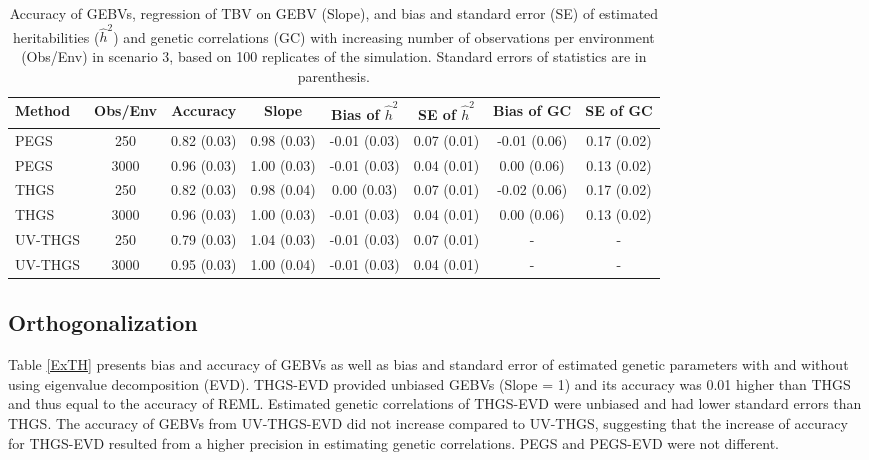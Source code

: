 \documentclass{bmcart}
\begin{document}
\begin{table}[ht]
\centering
\renewcommand*{\arraystretch}{1.2}
\caption{Accuracy of GEBVs, regression of TBV on GEBV (Slope), and bias and standard error (SE) of estimated heritabilities ($\hat{h}^2$) and genetic correlations (GC) with increasing number of observations per environment (Obs/Env) in scenario 3, based on 100 replicates of the simulation. Standard errors of statistics are in parenthesis.}\smallskip
\begin{tabular}{l c c c c c c c}
 \hline
Method & Obs/Env & Accuracy & Slope & Bias of $\hat{h}^2$ & SE of $\hat{h}^2$ & Bias of GC& SE of GC \\
 \hline
PEGS & 250 & 0.82 (0.03) & 0.98 (0.03) & -0.01 (0.03) & 0.07 (0.01) & -0.01 (0.06) & 0.17 (0.02) \\
PEGS & 3000 & 0.96 (0.03) & 1.00 (0.03) & -0.01 (0.03) & 0.04 (0.01) & 0.00 (0.06) & 0.13 (0.02) \\
THGS & 250 & 0.82 (0.03) & 0.98 (0.04) & 0.00 (0.03) & 0.07 (0.01) & -0.02 (0.06) & 0.17 (0.02) \\
THGS & 3000 & 0.96 (0.03) & 1.00 (0.03) & -0.01 (0.03) & 0.04 (0.01) & 0.00 (0.06) & 0.13 (0.02) \\
UV-THGS & 250 & 0.79 (0.03) & 1.04 (0.03) & -0.01 (0.03) & 0.07 (0.01) & - & - \\
UV-THGS & 3000 & 0.95 (0.03) & 1.00 (0.04) & -0.01 (0.03) & 0.04 (0.01) & - & - \\
 \hline
\end{tabular}
\label{VaryN}
\end{table}

\subsection{Orthogonalization}

Table \ref{ExTH} presents bias and accuracy of GEBVs as well as bias and standard error of estimated genetic parameters with and without using eigenvalue decomposition (EVD). THGS-EVD provided unbiased GEBVs (Slope = 1) and its accuracy was 0.01 higher than THGS and thus equal to the accuracy of REML. Estimated genetic correlations of THGS-EVD were unbiased and had lower standard errors than THGS. The accuracy of GEBVs from UV-THGS-EVD did not increase compared to UV-THGS, suggesting that the increase of accuracy for THGS-EVD resulted from a higher precision in estimating genetic correlations. PEGS and PEGS-EVD were not different.
\end{document}
